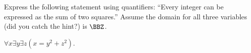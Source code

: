 \begin{exer}
Express the following statement using quantifiers:
``Every integer can be expressed as the sum of two squares.''
Assume the domain for all three variables (did you catch the hint?) is $\BBZ$.\\
\answerline
\begin{answer}
$\forall x\exists y \exists z (x=y^2+z^2)$.
\end{answer}
\end{exer}

%
% 
%
%
%
%
%
